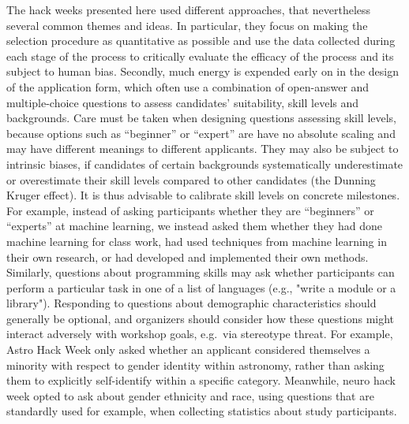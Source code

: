 The hack weeks presented here used different approaches, that nevertheless several common themes and ideas. In particular, they focus on making the selection procedure as quantitative as possible and use the data collected during each stage of the process to critically evaluate the efficacy of the process and its subject to human bias.
Secondly, much energy is expended early on in the design of the application form, which often use a combination of open-answer and multiple-choice questions to assess candidates' suitability, skill levels and backgrounds. Care must be taken when designing questions assessing skill levels, because options such as ``beginner'' or ``expert'' are have no absolute scaling and may have different meanings to different applicants. They may also be subject to intrinsic biases, if candidates of certain backgrounds systematically underestimate or overestimate their skill levels compared to other candidates (the Dunning Kruger effect). It is thus advisable to calibrate skill levels on concrete milestones. For example, instead of asking participants whether they are ``beginners'' or ``experts'' at machine learning, we instead asked them whether they had done machine learning for class work, had used techniques from machine learning in their own research, or had developed and implemented their own methods. Similarly, questions about programming skills may ask whether participants can perform a particular task in one of a list of languages  (e.g., "write a module or a library"). Responding to questions about demographic characteristics should generally be optional, and organizers should consider how these questions might interact adversely with workshop goals, e.g.\ via stereotype threat. For example, Astro Hack Week only asked whether an applicant considered themselves a minority with respect to gender identity within astronomy, rather than asking them to explicitly self-identify within a specific category. Meanwhile, neuro hack week opted to ask about gender ethnicity and race, using questions that are standardly used for example, when collecting statistics about study participants.

